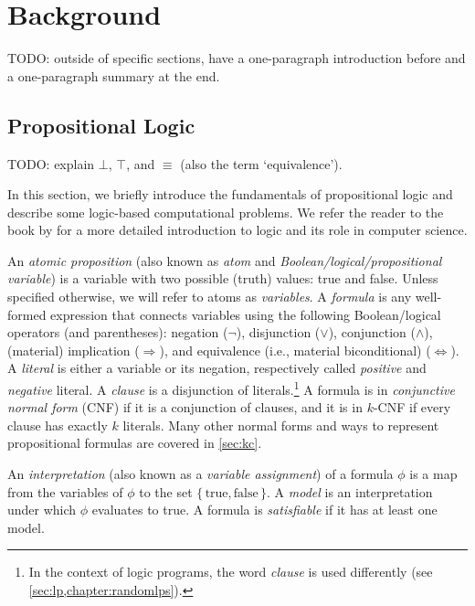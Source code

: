\chapter{Background}

TODO: outside of specific sections, have a one-paragraph introduction before and a one-paragraph summary at the end.

\section{Propositional Logic} \label{sec:proplogic}

TODO: explain $\bot$, $\top$, and $\equiv$ (also the term `equivalence').

In this section, we briefly introduce the fundamentals of propositional logic and describe some logic-based computational problems. We refer the reader to the book by \cite{DBLP:books/daglib/0029942} for a more detailed introduction to logic and its role in computer science.

An \emph{atomic proposition} (also known as \emph{atom} and \emph{Boolean/logical/propositional variable}) is a variable with two possible (truth) values: true and false. Unless specified otherwise, we will refer to atoms as \emph{variables}. A \emph{formula} is any well-formed expression that connects variables using the following Boolean/logical operators (and parentheses): negation ($\neg$), disjunction ($\lor$), conjunction ($\land$), (material) implication ($\Rightarrow$), and equivalence (i.e., material biconditional) ($\Leftrightarrow$). A \emph{literal} is either a variable or its negation, respectively called \emph{positive} and \emph{negative} literal. A \emph{clause} is a disjunction of literals.\footnote{In the context of logic programs, the word \emph{clause} is used differently (see \cref{sec:lp,chapter:randomlps}).} A formula is in \emph{conjunctive normal form} (CNF) if it is a conjunction of clauses, and it is in $k$-CNF if every clause has exactly $k$ literals. Many other normal forms and ways to represent propositional formulas are covered in \cref{sec:kc}.

An \emph{interpretation} (also known as a \emph{variable assignment}) of a formula $\phi$ is a map from the variables of $\phi$ to the set $\{\, \text{true}, \text{false} \,\}$. A \emph{model} is an interpretation under which $\phi$ evaluates to true. A formula is \emph{satisfiable} if it has at least one model.


